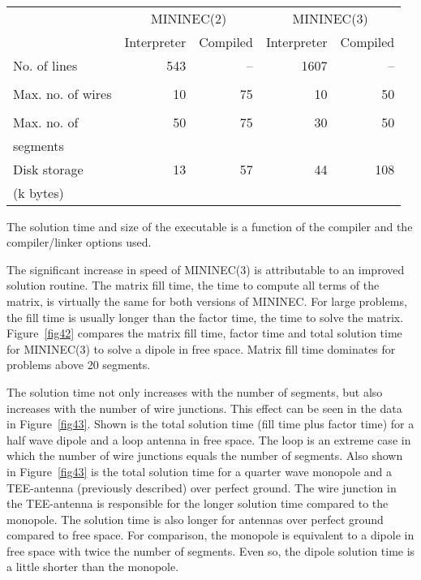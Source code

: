 \documentclass[12pt]{article}
\begin{document}
\ \\
\begin{tabular}{lrrrr}
&
\multicolumn{2}{c}{MININEC(2)} &
\multicolumn{2}{c}{MININEC(3)} \\
&
\multicolumn{1}{c}{Interpreter} &
\multicolumn{1}{c}{Compiled}    &
\multicolumn{1}{c}{Interpreter} &
\multicolumn{1}{c}{Compiled}    \\
No. of lines         & 543 & -- & 1607 &  -- \\
\\
Max. no. of wires    &  10 & 75 &   10 &  50 \\
\\
Max. no. of          &  50 & 75 &   30 &  50 \\
\quad segments \\
Disk storage         &  13 & 57 &   44 & 108 \\
\quad (k bytes) \\
\end{tabular}

The solution time and size of the executable is a function of the
compiler and the compiler/linker options used.

The significant increase in speed of MININEC(3) is attributable to an
improved solution routine. The matrix fill time, the time to compute all
terms of the matrix, is virtually the same for both versions of MININEC.
For large problems, the fill time is usually longer than the factor
time, the time to solve the matrix. Figure~\ref{fig42} compares the
matrix fill time, factor time and total solution time for MININEC(3) to
solve a dipole in free space. Matrix fill time dominates for problems
above 20 segments.

The solution time not only increases with the number of segments, but
also increases with the number of wire junctions. This effect can be
seen in the data in Figure~\ref{fig43}. Shown is the total solution time
(fill time plus factor time) for a half wave dipole and a loop antenna
in free space. The loop is an extreme case in which the number of wire
junctions equals the number of segments. Also shown in Figure~\ref{fig43}
is the total solution time for a quarter wave monopole and a TEE-antenna
(previously described) over perfect ground. The wire junction in the
TEE-antenna is responsible for the longer solution time compared to the
monopole. The solution time is also longer for antennas over perfect
ground compared to free space. For comparison, the monopole is
equivalent to a dipole in free space with twice the number of segments.
Even so, the dipole solution time is a little shorter than the monopole.
\end{document}
